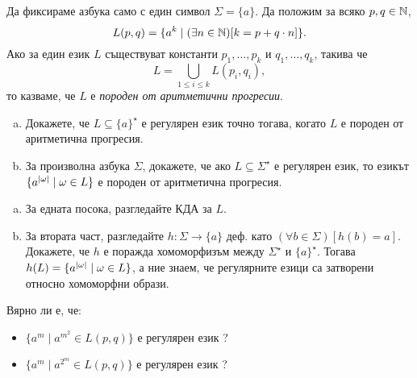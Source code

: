 \begin{problem}
  Да фиксираме азбука само с един символ $\Sigma = \{a\}$.
  Да положим за всяко $p,q\in\mathbb{N}$, 
  \[L(p,q) = \{a^k \mid (\exists n\in\mathbb{N})[k = p+q\cdot n]\}.\]
  Ако за един език $L$ съществуват константи $p_1,\dots,p_k$ и $q_1,\dots,q_k$, такива че 
  \[L = \bigcup_{1\leq i \leq k} L(p_i,q_i),\]
  то казваме, че $L$ е {\em породен от аритметични прогресии}.
  \begin{enumerate}[a)]
  \item 
    Докажете, че $L \subseteq \{a\}^\star$ е регулярен език точно тогава, когато $L$ е породен от аритметична прогресия.
  \item
    За произволна азбука $\Sigma$, докажете, че ако $L \subseteq \Sigma^\star$ е регулярен език,
    то езикът $\{a^{\lvert{\omega}\rvert} \mid \omega \in L\}$  е породен от аритметична прогресия.    
  \end{enumerate}
\end{problem}
\begin{hint}
  \begin{enumerate}[a)]
  \item 
    За едната посока, разгледайте КДА за $L$.
  \item
    За втората част, разгледайте $h:\Sigma\to\{a\}$ деф. като $(\forall b\in\Sigma)[h(b) = a]$.
    Докажете, че $h$ е поражда хомоморфизъм между $\Sigma^\star$ и $\{a\}^\star$.
    Тогава $h(L) = \{a^{\lvert{\omega}\rvert} \mid \omega \in L\}$, а
    ние знаем, че регулярните езици са затворени относно хомоморфни образи.  
  \end{enumerate}
\end{hint}

\begin{problem}
  Вярно ли е, че:
  \begin{itemize}
  \item 
    $\{a^m \mid a^{m^2} \in L(p,q)\}$ е регулярен език ?
  \item
    $\{a^m \mid a^{2^m} \in L(p,q)\}$ е регулярен език ?
  \end{itemize}
\end{problem}



